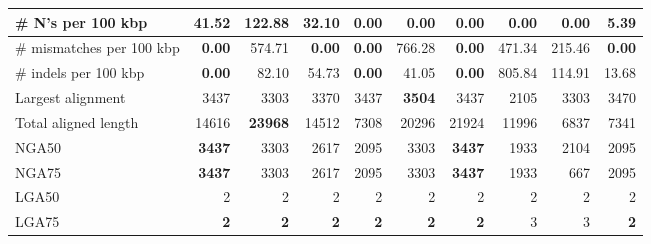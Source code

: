 \documentclass[12pt,a4paper]{article}
\begin{document}
\begin{table}[ht]
\begin{center}
\begin{tabular}{|l*{9}{|r}|}
\# N's per 100 kbp & 41.52 & 122.88 & 32.10 & {\bf 0.00} & {\bf 0.00} & {\bf 0.00} & {\bf 0.00} & {\bf 0.00} & 5.39 \\ \hline
\# mismatches per 100 kbp & {\bf 0.00} & 574.71 & {\bf 0.00} & {\bf 0.00} & 766.28 & {\bf 0.00} & 471.34 & 215.46 & {\bf 0.00} \\ \hline
\# indels per 100 kbp & {\bf 0.00} & 82.10 & 54.73 & {\bf 0.00} & 41.05 & {\bf 0.00} & 805.84 & 114.91 & 13.68 \\ \hline
Largest alignment & 3437 & 3303 & 3370 & 3437 & {\bf 3504} & 3437 & 2105 & 3303 & 3470 \\ \hline
Total aligned length & 14616 & {\bf 23968} & 14512 & 7308 & 20296 & 21924 & 11996 & 6837 & 7341 \\ \hline
NGA50 & {\bf 3437} & 3303 & 2617 & 2095 & 3303 & {\bf 3437} & 1933 & 2104 & 2095 \\ \hline
NGA75 & {\bf 3437} & 3303 & 2617 & 2095 & 3303 & {\bf 3437} & 1933 & 667 & 2095 \\ \hline
LGA50 & 2 & 2 & 2 & 2 & 2 & 2 & 2 & 2 & 2 \\ \hline
LGA75 & {\bf 2} & {\bf 2} & {\bf 2} & {\bf 2} & {\bf 2} & {\bf 2} & 3 & 3 & {\bf 2} \\ \hline
\end{tabular}
\end{center}
\end{table}
\end{document}
